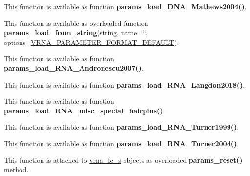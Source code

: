 \begin{DoxyRefList}
%
 This function is available as function {\bfseries{params\+\_\+load\+\_\+\+D\+N\+A\+\_\+\+Mathews2004()}}.  
\item[Global \mbox{\hyperlink{group__energy__parameters__rw_gabcd9cc7040a6b633b56b1cbd6a14d68e}{vrna\+\_\+params\+\_\+load\+\_\+from\+\_\+string}} (const char $\ast$string, const char $\ast$name, unsigned int options)]\label{wrappers__wrappers000100}%
%
 This function is available as overloaded function {\bfseries{params\+\_\+load\+\_\+from\+\_\+string}}(string, name=\char`\"{}\char`\"{}, options=\mbox{\hyperlink{group__energy__parameters__rw_ga2d46720ac5bf0e56ce0dbbff459667d2}{V\+R\+N\+A\+\_\+\+P\+A\+R\+A\+M\+E\+T\+E\+R\+\_\+\+F\+O\+R\+M\+A\+T\+\_\+\+D\+E\+F\+A\+U\+LT}}).  
\item[Global \mbox{\hyperlink{group__energy__parameters__rw_ga511a1c17c0fd10a1fbb0936674712ff8}{vrna\+\_\+params\+\_\+load\+\_\+\+R\+N\+A\+\_\+\+Andronescu2007}} (void)]\label{wrappers__wrappers000104}%
%
 This function is available as function {\bfseries{params\+\_\+load\+\_\+\+R\+N\+A\+\_\+\+Andronescu2007()}}.  
\item[Global \mbox{\hyperlink{group__energy__parameters__rw_ga3a87fe5e73eb906c0fa26f2c42c787fd}{vrna\+\_\+params\+\_\+load\+\_\+\+R\+N\+A\+\_\+\+Langdon2018}} (void)]\label{wrappers__wrappers000105}%
%
 This function is available as function {\bfseries{params\+\_\+load\+\_\+\+R\+N\+A\+\_\+\+Langdon2018()}}.  
\item[Global \mbox{\hyperlink{group__energy__parameters__rw_ga00e07504d66dc24aca7befb4bdaa0db1}{vrna\+\_\+params\+\_\+load\+\_\+\+R\+N\+A\+\_\+misc\+\_\+special\+\_\+hairpins}} (void)]\label{wrappers__wrappers000106}%
%
 This function is available as function {\bfseries{params\+\_\+load\+\_\+\+R\+N\+A\+\_\+misc\+\_\+special\+\_\+hairpins()}}.  
\item[Global \mbox{\hyperlink{group__energy__parameters__rw_ga804393b6dfe06a2c6cae89219dffabb1}{vrna\+\_\+params\+\_\+load\+\_\+\+R\+N\+A\+\_\+\+Turner1999}} (void)]\label{wrappers__wrappers000103}%
%
 This function is available as function {\bfseries{params\+\_\+load\+\_\+\+R\+N\+A\+\_\+\+Turner1999()}}.  
\item[Global \mbox{\hyperlink{group__energy__parameters__rw_ga7327fe66ef60c33ba80a87c04db0ee83}{vrna\+\_\+params\+\_\+load\+\_\+\+R\+N\+A\+\_\+\+Turner2004}} (void)]\label{wrappers__wrappers000102}%
%
 This function is available as function {\bfseries{params\+\_\+load\+\_\+\+R\+N\+A\+\_\+\+Turner2004()}}.  
\item[Global \mbox{\hyperlink{group__energy__parameters_gac40dc82e48a72a97cfc58b9da08a7792}{vrna\+\_\+params\+\_\+reset}} (vrna\+\_\+fold\+\_\+compound\+\_\+t $\ast$vc, vrna\+\_\+md\+\_\+t $\ast$md\+\_\+p)]\label{wrappers__wrappers000096}%
%
 This function is attached to \mbox{\hyperlink{group__fold__compound_structvrna__fc__s}{vrna\+\_\+fc\+\_\+s}} objects as overloaded {\bfseries{params\+\_\+reset()}} method.


\end{DoxyRefList}
